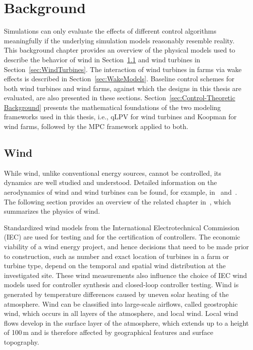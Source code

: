 \chapter{Background} \label{sec:Background}

Simulations can only evaluate the effects of different control algorithms meaningfully if the underlying simulation models reasonably resemble reality. This background chapter provides an overview of the physical models used to describe the behavior of wind in Section~\ref{sec:Wind} and wind turbines in Section~\ref{sec:WindTurbines}. The interaction of wind turbines in farms via wake effects is described in Section~\ref{sec:WakeModels}. Baseline control schemes for both wind turbines and wind farms, against which the designs in this thesis are evaluated, are also presented in these sections. Section~\ref{sec:Control-Theoretic Background} presents the mathematical foundations of the two modeling frameworks used in this thesis, i.e., qLPV for wind turbines and Koopman for wind farms, followed by the MPC framework applied to both.

\section{Wind} \label{sec:Wind}

While wind, unlike conventional energy sources, cannot be controlled, its dynamics are well studied and understood. Detailed information on the aerodynamics of wind and wind turbines can be found, for example, in~\cite{hansen2015aerodynamics} and~\cite{hau20084}. The following section provides an overview of the related chapter in~\cite{Bianchi2007}, which summarizes the physics of wind.

Standardized wind models from the International Electrotechnical Commission (IEC) are used for testing and for the certification of controllers. The economic viability of a wind energy project, and hence decisions that need to be made prior to construction, such as number and exact location of turbines in a farm or turbine type, depend on the temporal and spatial wind distribution at the investigated site. These wind measurements also influence the choice of IEC wind models used for controller synthesis and closed-loop controller testing.
%
Wind is generated by temperature differences caused by uneven solar heating of the atmosphere. Wind can be classified into large-scale airflows, called geostrophic wind, which occurs in all layers of the atmosphere, and local wind. Local wind flows develop in the surface layer of the atmosphere, which extends up to a height of 100\,m and is therefore affected by geographical features and surface topography.

